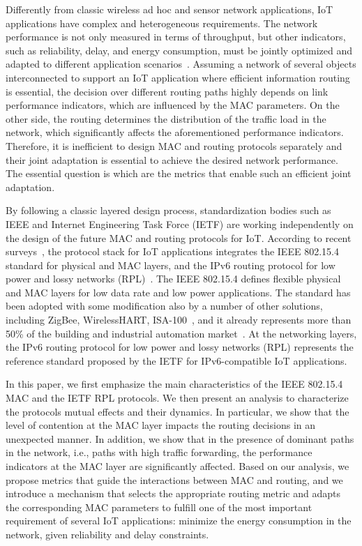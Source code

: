 \documentclass[review, 1p, 11pt]{elsarticle}
\numberwithin{equation}{section}
\begin{document}
Differently from classic wireless ad hoc and sensor network applications,
IoT applications have complex and heterogeneous requirements.
The network performance is not only measured in terms of throughput, but
other indicators, such as reliability, delay, and energy consumption, must be
jointly optimized and adapted to different application scenarios~\cite{trend}.
Assuming a network of several objects interconnected to support an IoT application
where efficient information routing is essential, the decision over different routing paths
highly depends on link performance indicators, which are  influenced by the MAC parameters.
On the other side, the routing determines the distribution of the traffic load in the
network, which significantly affects the aforementioned performance indicators.
Therefore, it is inefficient to design MAC and routing protocols separately and
their joint adaptation is essential to achieve the desired network performance.
The essential question is which are the metrics that enable such an efficient joint adaptation.

By following a classic layered design process, standardization bodies such as IEEE and Internet Engineering Task Force (IETF) are
working independently on the design of the future MAC and routing protocols for IoT.
According to recent surveys~\cite{palattella_iot}, the protocol stack for
IoT applications integrates the IEEE 802.15.4~\cite{ieee802154} standard for physical and MAC layers,
and the IPv6 routing protocol for low power and lossy networks
(RPL)~\cite{ROLL}.
The IEEE 802.15.4 defines flexible physical and MAC layers
for low data rate and low power applications.
The standard has been adopted with
some modification also by a number of other solutions, including
ZigBee, WirelessHART, ISA-100~\cite{BarontiCC}, and it
already represents more than 50\% of the building and industrial
automation market~\cite{zigbee2011}.
At the networking layers, the
IPv6 routing protocol for low power and lossy networks
(RPL) represents the reference standard proposed by the IETF for IPv6-compatible IoT applications.

In this paper, we first emphasize the main characteristics of the IEEE 802.15.4 MAC and the IETF RPL protocols. We then present an analysis to
characterize the protocols mutual effects and their dynamics. In particular, we show that the level of contention at the MAC layer
impacts the routing decisions in an unexpected manner. In addition, we show that in the presence of dominant paths
in the network, i.e., paths with high traffic forwarding, the performance indicators at the MAC layer are significantly affected. Based on our analysis, we propose metrics that guide the interactions between MAC and routing, and we introduce a mechanism that selects the appropriate routing metric and adapts the corresponding MAC parameters to fulfill one of the most important requirement of several IoT applications: minimize the energy consumption in the network, given reliability and delay constraints.
\end{document}
